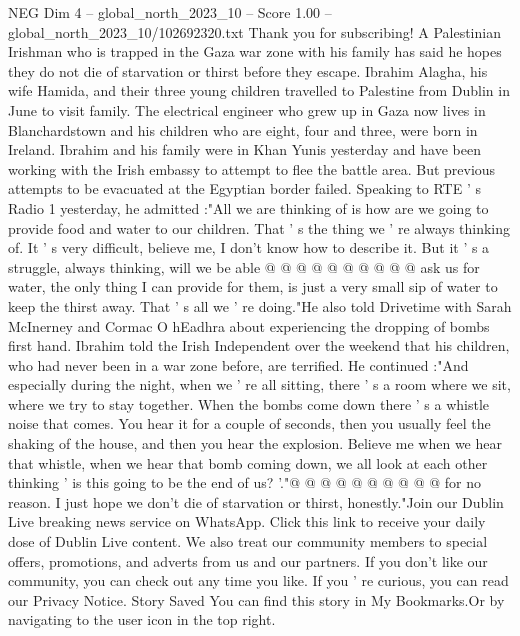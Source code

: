 \begin{textsample}{NEG Dim 4 – global\_north\_2023\_10 – Score 1.00 – global\_north\_2023\_10/102692320.txt}  \label{ex:f4_neg_013}
Thank you for subscribing!
A Palestinian Irishman who is trapped in the Gaza war zone with his family has said he hopes they do not die of starvation or thirst before they escape.
Ibrahim Alagha, his wife Hamida, and their three young children travelled to Palestine from Dublin in June to visit family.
The electrical engineer who grew up in Gaza now lives in Blanchardstown and his children who are eight, four and three, were born in Ireland.
Ibrahim and his family were in Khan Yunis yesterday and have been working with the Irish embassy to attempt to flee the battle area.
But previous attempts to be evacuated at the Egyptian border failed.
Speaking to RTE ' s Radio 1 yesterday, he admitted :"All we are thinking of is how are we going to provide food and water to our children.
That ' s the thing we ' re always thinking of.
It ' s very difficult, believe me, I don't know how to describe it.
But it ' s a struggle, always thinking, will we be able @ @ @ @ @ @ @ @ @ @ ask us for water, the only thing I can provide for them, is just a very small sip of water to keep the thirst away.
That ' s all we ' re doing."He also told Drivetime with Sarah McInerney and Cormac O hEadhra about experiencing the dropping of bombs first hand.
Ibrahim told the Irish Independent over the weekend that his children, who had never been in a war zone before, are terrified.
He continued :"And especially during the night, when we ' re all sitting, there ' s a room where we sit, where we try to stay together.
When the bombs come down there ' s a whistle noise that comes.
You hear it for a couple of seconds, then you usually feel the shaking of the house, and then you hear the explosion.
Believe me when we hear that whistle, when we hear that bomb coming down, we all look at each other thinking ' is this going to be the end of us? '."@ @ @ @ @ @ @ @ @ @ for no reason.
I just hope we don't die of starvation or thirst, honestly."Join our Dublin Live breaking news service on WhatsApp.
Click this link to receive your daily dose of Dublin Live content.
We also treat our community members to special offers, promotions, and adverts from us and our partners.
If you don't like our community, you can check out any time you like.
If you ' re curious, you can read our Privacy Notice.
Story Saved You can find this story in My Bookmarks.Or by navigating to the user icon in the top right.

\end{textsample}
